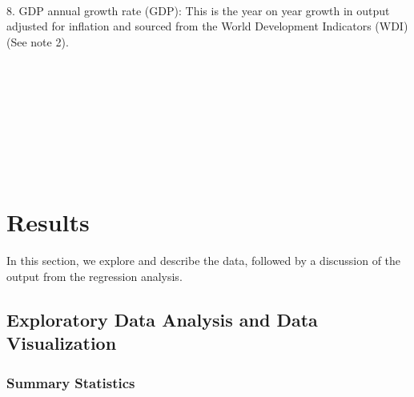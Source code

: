 \documentclass[a4paper, nobind]{templates/ociamthesis}
\begin{document}
\begin{table}
\begin{tabu}
\\
8. GDP annual growth rate (GDP): This is the year on year growth in output adjusted for inflation and sourced from the World Development Indicators (WDI) (See note 2).\\
\addlinespace
\\
\bottomrule
{}\\
\\
\\
\\
\\
\\
\\
\end{tabu}
\end{table}

\hypertarget{results-2}{%
\section{Results}\label{results-2}}

In this section, we explore and describe the data, followed by a discussion of the output from the regression analysis.

\hypertarget{exploratory-data-analysis-and-data-visualization}{%
\subsection{Exploratory Data Analysis and Data Visualization}\label{exploratory-data-analysis-and-data-visualization}}

\hypertarget{summary-statistics-2}{%
\subsubsection{Summary Statistics}\label{summary-statistics-2}}
\end{document}
